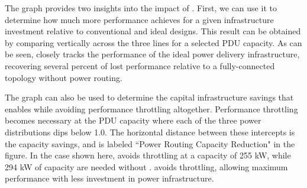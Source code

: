 The graph provides two insights into the impact of \PowerRouting.  First, we can use it to determine how much more performance \PowerRouting achieves for a given infrastructure investment relative to conventional and ideal designs.  This result can be obtained by comparing vertically across the three lines for a selected PDU capacity. As can be seen, \PowerRouting closely tracks the performance of the ideal power delivery infrastructure, recovering several percent of lost performance relative to a fully-connected topology without power routing.

The graph can also be used to determine the capital infrastructure savings that \PowerRouting enables while avoiding performance throttling altogether.  Performance throttling becomes necessary at the PDU capacity where each of the three power distributions dips below 1.0.  The horizontal distance between these intercepts is the capacity savings, and is labeled  ``Power Routing Capacity Reduction" in the figure. In the case shown here, \PowerRouting avoids throttling at a capacity of 255 kW, while 294 kW of capacity are needed without \PowerRouting. \PowerRouting avoids throttling, allowing maximum performance with less investment in power infrastructure.
